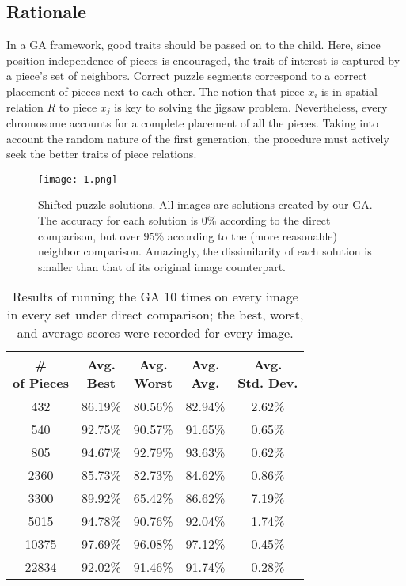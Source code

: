 \documentclass[10pt,twocolumn,letterpaper]{article}
\begin{document}
\subsection{Rationale}
In a GA framework, good traits should be passed on to the child. Here, since position independence of pieces is encouraged, the trait of interest is captured by a piece's set of neighbors. Correct puzzle segments correspond to a correct placement of pieces next to each other. The notion that piece $x_i$ is in spatial relation $R$ to piece $x_j$ is key to solving the jigsaw problem. Nevertheless, every chromosome accounts for a complete placement of all the pieces. Taking into account the random nature of the first generation, the procedure must actively seek the better traits of piece relations. 
\begin{figure*}
\begin{center}
\texttt{[image: 1.png]}
\end{center}
\caption{Shifted puzzle solutions. All images are solutions created by our GA. The accuracy for each solution is 0\% according to the direct comparison, but over 95\% according to the (more reasonable) neighbor comparison. Amazingly, the dissimilarity of each solution is smaller than that of its original image counterpart.}
\label{fig}
\end{figure*}
\begin{table}
\begin{center}
\begin{tabular}{|c|c|c|c|c|}
  \hline
  \makecell[c]{\# \\ of Pieces} &  \makecell[c]{Avg. \\ Best} & 
  \makecell[c]{Avg. \\ Worst} & \makecell[c]{Avg. \\ Avg.} &  
  \makecell[c]{Avg. \\ Std. Dev.} \\ 
  \hline \hline
  432 & 86.19\% & 80.56\% & 82.94\% & 2.62\% \\ \hline
  540 & 92.75\% & 90.57\% & 91.65\% & 0.65\% \\ \hline
  805 & 94.67\% & 92.79\% & 93.63\% & 0.62\% \\ \hline
  2360 & 85.73\% & 82.73\% & 84.62\% & 0.86\% \\ \hline
  3300 & 89.92\% & 65.42\% & 86.62\% & 7.19\% \\ \hline
  5015 & 94.78\% & 90.76\% & 92.04\% & 1.74\% \\ \hline
  10375 & 97.69\% & 96.08\% & 97.12\% & 0.45\% \\ \hline
  22834 & 92.02\% & 91.46\% & 91.74\% & 0.28\% \\ \hline
\end{tabular}
\end{center}
\caption{Results of running the GA 10 times on every image in every set under direct comparison; the best, worst, and average scores were recorded for every image.}
\label{tab}
\end{table}
\end{document}
